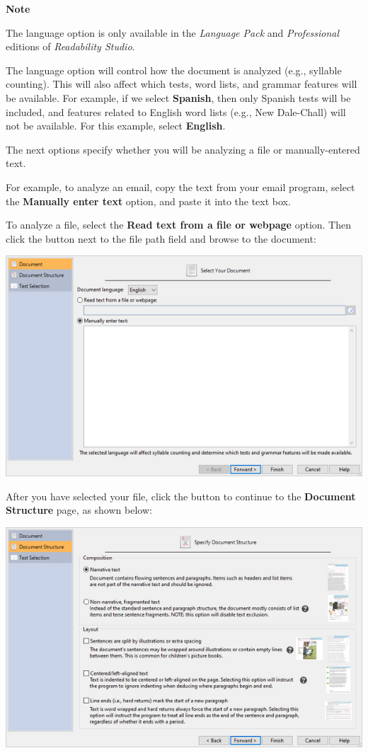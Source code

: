\documentclass[
]{book}
\newenvironment{notesection}
    {
    \begin{tcolorbox}[colframe=mediumblue,colback=lightblue,coltext=mediumblue,arc=3mm]
    \faLightbulb[regular] \textbf{Note} \newline
    }
    {
    \end{tcolorbox}
    }
\theoremstyle{definition}
\theoremstyle{definition}
\theoremstyle{definition}
\theoremstyle{definition}
\theoremstyle{remark}
\begin{document}
\begin{notesection}
The language option is only available in the \emph{Language Pack} and \emph{Professional} editions of \emph{Readability Studio}.

\end{notesection}

The language option will control how the document is analyzed (e.g., syllable counting). This will also affect which tests, word lists, and grammar features will be available. For example, if we select \textbf{Spanish}, then only Spanish tests will be included, and features related to English word lists (e.g., New Dale-Chall) will not be available. For this example, select \textbf{English}.

The next options specify whether you will be analyzing a file or manually-entered text.

For example, to analyze an email, copy the text from your email program, select the \textbf{Manually enter text} option, and paste it into the text box.

To analyze a file, select the \textbf{Read text from a file or webpage} option. Then click the button next to the file path field and browse to the document:

\includegraphics{Images/wizardentertext.png}

After you have selected your file, click the  button to continue to the \textbf{Document Structure} page, as shown below:

\includegraphics{Images/wizarddocstructure.png}
\end{document}
